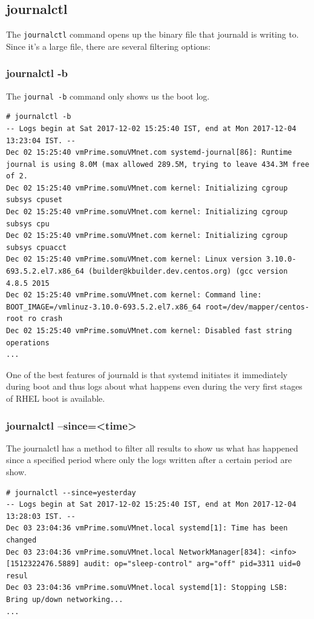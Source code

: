 \subsection{journalctl}
The \verb|journalctl| command opens up the binary file that journald is writing to. Since it's a large file, there are several filtering options:

\subsubsection{journalctl -b}
\vspace{-10pt}
The \verb|journal -b| command only shows us the boot log. 

\vspace{-15pt}
\begin{verbatim}
# journalctl -b
-- Logs begin at Sat 2017-12-02 15:25:40 IST, end at Mon 2017-12-04 13:23:04 IST. --
Dec 02 15:25:40 vmPrime.somuVMnet.com systemd-journal[86]: Runtime journal is using 8.0M (max allowed 289.5M, trying to leave 434.3M free of 2.
Dec 02 15:25:40 vmPrime.somuVMnet.com kernel: Initializing cgroup subsys cpuset
Dec 02 15:25:40 vmPrime.somuVMnet.com kernel: Initializing cgroup subsys cpu
Dec 02 15:25:40 vmPrime.somuVMnet.com kernel: Initializing cgroup subsys cpuacct
Dec 02 15:25:40 vmPrime.somuVMnet.com kernel: Linux version 3.10.0-693.5.2.el7.x86_64 (builder@kbuilder.dev.centos.org) (gcc version 4.8.5 2015
Dec 02 15:25:40 vmPrime.somuVMnet.com kernel: Command line: BOOT_IMAGE=/vmlinuz-3.10.0-693.5.2.el7.x86_64 root=/dev/mapper/centos-root ro crash
Dec 02 15:25:40 vmPrime.somuVMnet.com kernel: Disabled fast string operations
...
\end{verbatim}
\vspace{-10pt}

\noindent
One of the best features of journald is that systemd initiates it immediately during boot and thus logs about what happens even during the very first stages of RHEL boot is available. 

\subsubsection{journalctl --since=<time>}
\vspace{-10pt}
The journalctl has a method to filter all results to show us what has happened since a specified period where only the logs written after a certain period are show.

\vspace{-15pt}
\begin{verbatim}
# journalctl --since=yesterday
-- Logs begin at Sat 2017-12-02 15:25:40 IST, end at Mon 2017-12-04 13:28:03 IST. --
Dec 03 23:04:36 vmPrime.somuVMnet.local systemd[1]: Time has been changed
Dec 03 23:04:36 vmPrime.somuVMnet.local NetworkManager[834]: <info>  [1512322476.5889] audit: op="sleep-control" arg="off" pid=3311 uid=0 resul
Dec 03 23:04:36 vmPrime.somuVMnet.local systemd[1]: Stopping LSB: Bring up/down networking...
...
\end{verbatim}
\vspace{-10pt}

